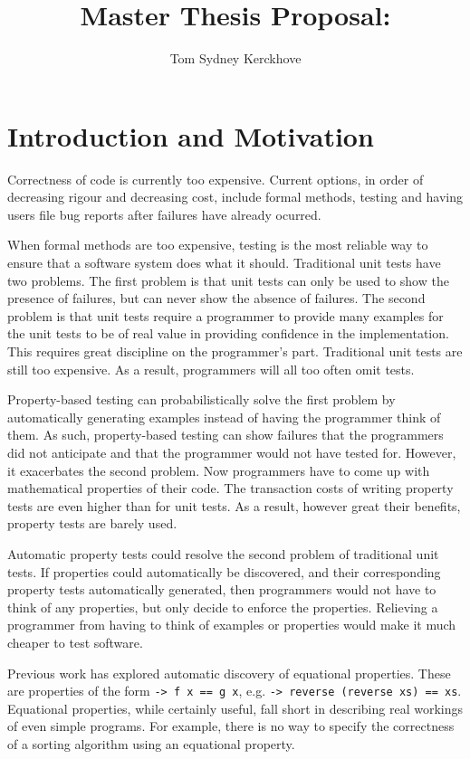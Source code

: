 \documentclass[a4paper, 11pt]{article}
\title{Master Thesis Proposal:\\\vspace{0.5cm}{\Huge Functional Property Discovery and Corresponding Test Generation in Haskell}}
\author{Tom Sydney Kerckhove}
\begin{document}
\maketitle

\section{Introduction and Motivation}

Correctness of code is currently too expensive.
Current options, in order of decreasing rigour and decreasing cost, include formal methods, testing and having users file bug reports after failures have already ocurred.

When formal methods are too expensive, testing is the most reliable way to ensure that a software system does what it should.
Traditional unit tests have two problems.
The first problem is that unit tests can only be used to show the presence of failures, but can never show the absence of failures.
The second problem is that unit tests require a programmer to provide many examples for the unit tests to be of real value in providing confidence in the implementation.
This requires great discipline on the programmer's part.
Traditional unit tests are still too expensive.
As a result, programmers will all too often omit tests.

Property-based testing \cite{QuickCheck} can probabilistically solve the first problem by automatically generating examples instead of having the programmer think of them.
As such, property-based testing can show failures that the programmers did not anticipate and that the programmer would not have tested for.
However, it exacerbates the second problem.
Now programmers have to come up with mathematical properties of their code.
The transaction costs of writing property tests are even higher than for unit tests.
As a result, however great their benefits, property tests are barely used.

Automatic property tests could resolve the second problem of traditional unit tests.
If properties could automatically be discovered, and their corresponding property tests automatically generated, then programmers would not have to think of any properties, but only decide to enforce the properties.
Relieving a programmer from having to think of examples or properties would make it much cheaper to test software.

Previous work \cite{QuickSpec} has explored automatic discovery of equational properties.
These are properties of the form \texttt{\x -> f x == g x}, e.g. \texttt{\xs -> reverse (reverse xs) == xs}.
Equational properties, while certainly useful, fall short in describing real workings of even simple programs.
For example, there is no way to specify the correctness of a sorting algorithm using an equational property.
\end{document}
